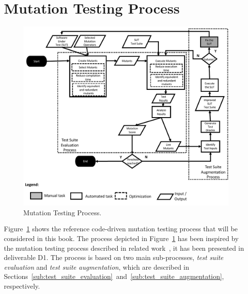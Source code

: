
\section{Mutation Testing Process}
\label{sec:process}

	\begin{figure}
	\centering
		\includegraphics[width=\textwidth]{images/process}
		\caption{Mutation Testing Process.}
		\label{fig:code:process}
	\end{figure}

Figure~\ref{fig:code:process} shows the reference code-driven mutation testing process that will be considered in this book. The process depicted in Figure~\ref{fig:code:process} has been inspired by the mutation testing process described in related work~\cite{offutt2001mutation,papadakis2019mutation}, it has been presented in deliverable D1. The process is based on two main sub-processes, \emph{test suite evaluation} and \emph{test suite augmentation}, which are described in Sections~\ref{sub:test_suite_evaluation}~and~\ref{sub:test_suite_augmentation}, respectively.


\endinput

